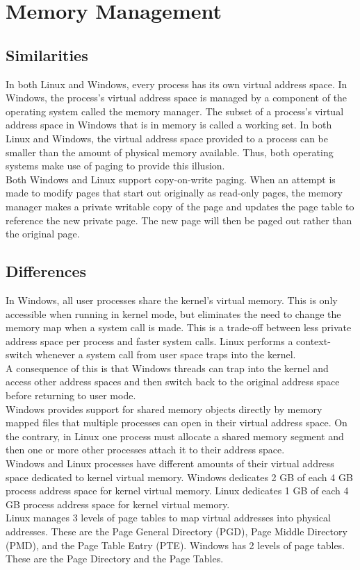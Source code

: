 \documentclass[letterpaper,10pt,titlepage]{article}
\begin{document}
\section{Memory Management}
\subsection{Similarities}
In both Linux and Windows, every process has its own virtual address space.
In Windows, the process's virtual address space is managed by a component
of the operating system called the memory manager. The subset of a process's
virtual address space in Windows that is in memory is called a working set.
In both Linux and Windows, the virtual address space provided to a process
can be smaller than the amount of physical memory available. Thus, both 
operating systems make use of paging to provide this illusion.
\\
\linebreak
Both Windows and Linux support copy-on-write paging. When an attempt is made
to modify pages that start out originally as read-only pages, the memory 
manager makes a private writable copy of the page and updates the page table 
to reference the new private page. The new page will then be paged out rather
than the original page.
\subsection{Differences}
In Windows, all user processes share the kernel's virtual memory. This is only 
accessible when running in kernel mode, but eliminates the need to change the
memory map when a system call is made. This is a trade-off between less private
address space per process and faster system calls. Linux performs a 
context-switch whenever a system call from user space traps into the kernel. 
\\
\linebreak
A consequence of this is that Windows threads can trap into the kernel and 
access other address spaces and then switch back to the original address space
before returning to user mode.
\\
\linebreak
Windows provides support for shared memory objects directly by memory 
mapped files that multiple processes can open in their virtual address space.
On the contrary, in Linux one process must allocate a shared memory segment and
then one or more other processes attach it to their address space.
\\
\linebreak
Windows and Linux processes have different amounts of their virtual address
space dedicated to kernel virtual memory. Windows dedicates 2 GB of each 4 GB
process address space for kernel virtual memory. Linux dedicates 1 GB of each
4 GB process address space for kernel virtual memory.
\\ 
\linebreak
Linux manages 3 levels of page tables to map virtual addresses into physical
addresses. These are the Page General Directory (PGD), Page Middle Directory
(PMD), and the Page Table Entry (PTE). Windows has 2 levels of page tables. 
These are the Page Directory and the Page Tables.
\end{document}
